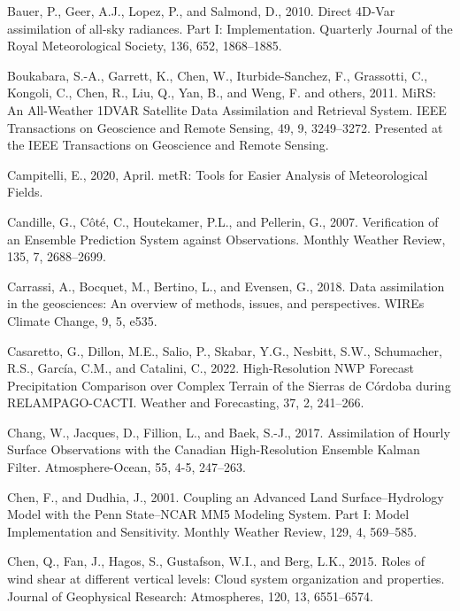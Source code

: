 \documentclass[12pt,oneside]{reedthesis}
\begin{document}
\leavevmode\hypertarget{ref-bauer2010}{}%
Bauer, P., Geer, A.J., Lopez, P., and Salmond, D., 2010. Direct 4D-Var assimilation of all-sky radiances. Part I: Implementation. Quarterly Journal of the Royal Meteorological Society, 136, 652, 1868--1885.

\leavevmode\hypertarget{ref-boukabara2011}{}%
Boukabara, S.-A., Garrett, K., Chen, W., Iturbide-Sanchez, F., Grassotti, C., Kongoli, C., Chen, R., Liu, Q., Yan, B., and Weng, F. and others, 2011. MiRS: An All-Weather 1DVAR Satellite Data Assimilation and Retrieval System. IEEE Transactions on Geoscience and Remote Sensing, 49, 9, 3249--3272. Presented at the IEEE Transactions on Geoscience and Remote Sensing.

\leavevmode\hypertarget{ref-campitelli2020}{}%
Campitelli, E., 2020, April. metR: Tools for Easier Analysis of Meteorological Fields.

\leavevmode\hypertarget{ref-candille2007}{}%
Candille, G., Côté, C., Houtekamer, P.L., and Pellerin, G., 2007. Verification of an Ensemble Prediction System against Observations. Monthly Weather Review, 135, 7, 2688--2699.

\leavevmode\hypertarget{ref-carrassi2018}{}%
Carrassi, A., Bocquet, M., Bertino, L., and Evensen, G., 2018. Data assimilation in the geosciences: An overview of methods, issues, and perspectives. WIREs Climate Change, 9, 5, e535.

\leavevmode\hypertarget{ref-casaretto2022}{}%
Casaretto, G., Dillon, M.E., Salio, P., Skabar, Y.G., Nesbitt, S.W., Schumacher, R.S., García, C.M., and Catalini, C., 2022. High-Resolution NWP Forecast Precipitation Comparison over Complex Terrain of the Sierras de Córdoba during RELAMPAGO-CACTI. Weather and Forecasting, 37, 2, 241--266.

\leavevmode\hypertarget{ref-chang2017}{}%
Chang, W., Jacques, D., Fillion, L., and Baek, S.-J., 2017. Assimilation of Hourly Surface Observations with the Canadian High-Resolution Ensemble Kalman Filter. Atmosphere-Ocean, 55, 4-5, 247--263.

\leavevmode\hypertarget{ref-chen2001}{}%
Chen, F., and Dudhia, J., 2001. Coupling an Advanced Land Surface--Hydrology Model with the Penn State--NCAR MM5 Modeling System. Part I: Model Implementation and Sensitivity. Monthly Weather Review, 129, 4, 569--585.

\leavevmode\hypertarget{ref-chen2015}{}%
Chen, Q., Fan, J., Hagos, S., Gustafson, W.I., and Berg, L.K., 2015. Roles of wind shear at different vertical levels: Cloud system organization and properties. Journal of Geophysical Research: Atmospheres, 120, 13, 6551--6574.
\end{document}

